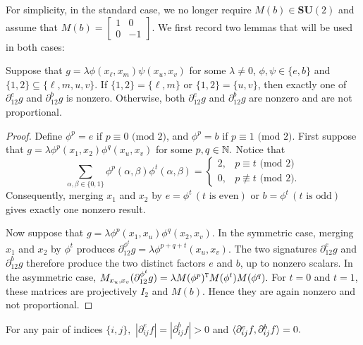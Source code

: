 For simplicity, in the standard case, we no longer require $M(b)\in \mathbf{SU}(2)$ 
and assume that $M(b)=\left[\begin{matrix}
    1 & 0\\
    0 & -1
\end{matrix}\right].$
We first record two lemmas that will be used in both cases:
\begin{lemma}\label{lem:c2-two-projection}
    Suppose that $g=\lambda\phi(x_\ell,x_m)\psi(x_u,x_v)$ for some $\lambda\neq 0$, $\phi,\psi\in\{e,b\}$ and $\{1,2\}\subseteq\{\ell,m,u,v\}.$
    If $\{1,2\}=\{\ell,m\}$ or $\{1,2\}=\{u,v\}$, then exactly one of
    $\partial_{12}^{e}g$ and $\partial_{12}^{b}g$ is nonzero.  
    Otherwise, both $\partial_{12}^{e}g$ and $\partial_{12}^{b}g$ are nonzero and are not proportional.
\end{lemma}

\begin{proof}
    Define $\phi^p=e$ if $p \equiv 0 \text{ (mod }{2})$, and $\phi^p=b$ if $p \equiv 1 \text{ (mod }{2})$.
    First suppose that $g=\lambda\phi^p(x_1,x_2)\phi^q(x_u,x_v)$ for some $p,q\in \mathbb{N}.$
    Notice that
    \[
     \sum_{\alpha,\beta\in\{0,1\}}
     \phi^p(\alpha,\beta)\phi^t(\alpha,\beta)
     =
     \begin{cases}
     2,&p \equiv t \text{ (mod }{2})\\
     0,&p \not\equiv t \text{ (mod }{2}).
     \end{cases}
    \]
    Consequently, merging $x_1$ and $x_2$ by $e=\phi^t \,(t \text{ is even})$ or $b=\phi^t\,(t \text{ is odd})$ gives exactly one nonzero result.

    Now suppose that $g=\lambda\phi^p(x_1,x_u)\phi^q(x_2,x_v)$.
    In the symmetric case, merging $x_1$ and $x_2$ by $\phi^t$ produces $\partial_{12}^{\phi^t} g=\lambda\phi^{p+q+t}(x_u,x_v)$.
    The two signatures $\partial_{12}^eg$ and $\partial_{12}^bg$ therefore produce the two distinct factors $e$ and $b$, up to nonzero scalars.
    In the asymmetric case, $M_{x_u,x_v}(\partial_{12}^{\phi^t} g)=\lambda M(\phi^p)^{\tt T}M(\phi^t)M(\phi^q).$
    For $t=0$ and $t=1$, these matrices are projectively $I_2$ and $M(b)$. 
    Hence they are again nonzero and not proportional.
\end{proof}

\begin{lemma}\label{lm: C2 contraction orth}
    For any pair of indices $\{i,j\},$ $|\partial_{ij}^{e}f|=|\partial_{ij}^bf|> 0$ and $\braket{\partial_{ij}^ef,\partial_{ij}^bf}=0.$
\end{lemma}

